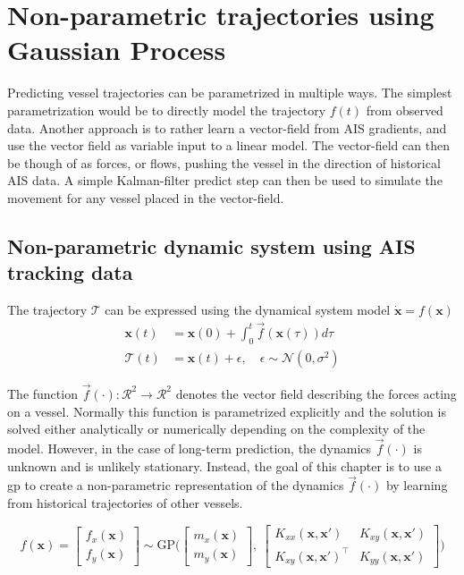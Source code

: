 \chapter{Non-parametric trajectories using Gaussian Process}\label{chap:impl}
Predicting vessel trajectories can be parametrized in multiple ways. The simplest parametrization would be to directly model the trajectory $f(t)$ from observed data. Another approach is to rather learn a vector-field from AIS gradients, and use the vector field as variable input to a linear model. The vector-field can then be though of as forces, or flows, pushing the vessel in the direction of historical AIS data. A simple Kalman-filter predict step can then be used to simulate the movement for any vessel placed in the vector-field. 


\section{Non-parametric dynamic system using AIS tracking data}

The trajectory $\mathcal{T}$ can be expressed using the dynamical system model $\dot{\boldsymbol{x}} = f(\boldsymbol{x})$
\begin{subequations}
\begin{align}
    \boldsymbol{x}(t) &= \boldsymbol{x}(0) + \int_0^t \vec{f}(\boldsymbol{x}(\tau)) d\tau \\
    \mathcal{T}(t) &= \boldsymbol{x}(t) + \epsilon, \quad \epsilon \sim \mathcal{N}(0, \sigma^2)
\end{align}
\end{subequations}

The function $\vec{f}(\cdot): \mathcal{R}^2 \to \mathcal{R}^2$ denotes the vector field describing the forces acting on a vessel. Normally this function is parametrized explicitly and the solution is solved either analytically or numerically depending on the complexity of the model. However, in the case of long-term prediction, the dynamics $\vec{f}(\cdot)$ is unknown and is unlikely stationary. Instead, the goal of this chapter is to use a \acrshort{gp} to create a non-parametric representation of the dynamics $\vec{f}(\cdot)$ by learning from historical trajectories of other vessels.

\begin{equation}\label{eq:gp_vec_field}
    f(\boldsymbol{x}) = \begin{bmatrix} f_x (\boldsymbol{x})\\ f_y (\boldsymbol{x})\end{bmatrix} \sim \text{GP} \big(\begin{bmatrix} m_x(\boldsymbol{x})\\m_y(\boldsymbol{x})\end{bmatrix}, \ \begin{bmatrix}
    K_{xx}(\boldsymbol{x}, \boldsymbol{x}') & K_{xy}(\boldsymbol{x}, \boldsymbol{x}') \\ K_{xy}(\boldsymbol{x}, \boldsymbol{x}')^\intercal & K_{yy}(\boldsymbol{x}, \boldsymbol{x}')
    \end{bmatrix}\big) 
\end{equation}

